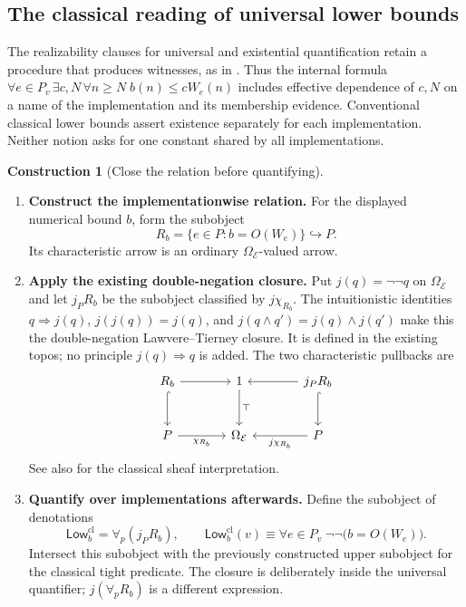 \documentclass[11pt,a4paper]{article}
\numberwithin{algorithm}{section}
\numberwithin{equation}{section}
\theoremstyle{definition}
\theoremstyle{remark}
\theoremstyle{plain}
\newcommand{\E}{\mathcal E}
\newcommand{\Truth}{\Omega_{\E}}
\newcommand{\incl}{\hookrightarrow}
\theoremstyle{definition}
\newtheorem{construction}[construction]{Construction}
\theoremstyle{plain}
\begin{document}
\subsection{The classical reading of universal lower bounds}

\label{sec:wc-classical-lower}

The realizability clauses for universal and existential quantification
retain a procedure that produces witnesses, as in
\citet[Section 5]{Kleene1945}. Thus the internal formula
$\forall e\in P_v\,\exists c,N\,\forall n\ge N\;
b(n)\le cW_e(n)$ includes effective dependence of $c,N$ on a name of
the implementation and its membership evidence. Conventional classical
lower bounds assert existence separately for each implementation.
Neither notion asks for one constant shared by all implementations.

\begin{construction}[Close the relation before quantifying]
\label{constr:wc-classical-lower}
\leavevmode
\begin{enumerate}[leftmargin=*,align=left]
\item \textbf{Construct the implementationwise relation.}
For the displayed numerical bound $b$, form the subobject
\[
 R_b=\{e\in P:b=O(W_e)\}\incl P.
\]
Its characteristic arrow is an ordinary $\Truth$-valued arrow.
\item \textbf{Apply the existing double-negation closure.}
Put $j(q)=\neg\neg q$ on $\Truth$ and let $j_P R_b$ be the
subobject classified by $j\chi_{R_b}$. The intuitionistic identities
$q\Rightarrow j(q)$, $j(j(q))=j(q)$, and
$j(q\wedge q')=j(q)\wedge j(q')$ make this the double-negation
Lawvere--Tierney closure. It is defined in the existing topos; no
principle $j(q)\Rightarrow q$ is added. The two characteristic
pullbacks are
\[
\begin{tikzcd}[column sep=large,row sep=large]
 R_b \arrow[r] \arrow[d,hook] &1 \arrow[d,"\top"]
   &j_P R_b \arrow[l] \arrow[d,hook]\\
 P \arrow[r,"\chi_{R_b}"'] &\Truth
   &P \arrow[l,"j\chi_{R_b}"]
\end{tikzcd}
\]
See also
\citet[Proposition 4.4]{Hyland1982EffectiveTopos} for the classical sheaf interpretation.
\item \textbf{Quantify over implementations afterwards.}
Define the subobject of denotations
\[
 \mathsf{Low}^{\mathrm{cl}}_b=\forall_p(j_P R_b),\qquad
 \mathsf{Low}^{\mathrm{cl}}_b(v)\equiv
 \forall e\in P_v\;\neg\neg\bigl(b=O(W_e)\bigr).
\]
Intersect this subobject with the previously constructed upper subobject
for the classical tight predicate. The closure is deliberately inside
the universal quantifier; $j(\forall_pR_b)$ is a different expression.
\end{enumerate}
\end{construction}
\end{document}

